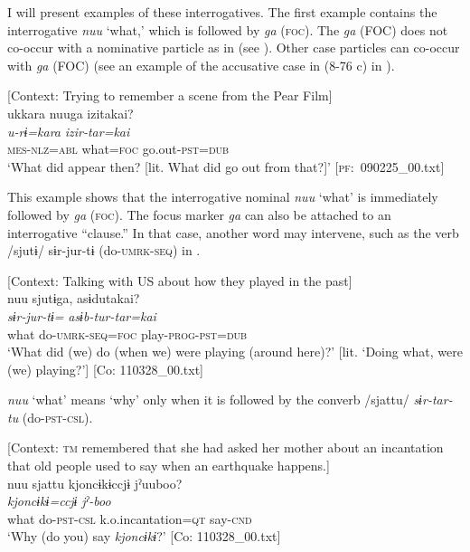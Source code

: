   I will present examples of these interrogatives. The first example contains the interrogative \textit{nuu} ‘what,’ which is followed by \textit{ga} (\textsc{foc}). The \textit{ga} (FOC) does not co-occur with a nominative particle as in  (see ). Other case particles can co-occur with \textit{ga} (FOC) (see an example of the accusative case in (8-76 c) in ).

\ea \label{ex:5:31}   [Context: Trying to remember a scene from the Pear Film]\\
\glll  ukkara  nuuga  izitakai?\\
\textit{u-rɨ=kara}  \textit{}  \textit{izir-tar=kai}\\
\textsc{mes}-\textsc{nlz}=\textsc{abl}  what=\textsc{foc}  go.out-\textsc{pst}=\textsc{dub}\\
\glt ‘What did appear then? [lit. What did go out from that?]’ [\textsc{pf}:~090225\_00.txt]
\z

This example shows that the interrogative nominal \textit{nuu} ‘what’ is immediately followed by \textit{ga} (\textsc{foc}). The focus marker \textit{ga} can also be attached to an interrogative “clause.” In that case, another word may intervene, such as the verb /sjutɨ/ sɨr-jur-tɨ (do-\textsc{umrk}-\textsc{seq}) in .

\ea \label{ex:5:32}   [Context: Talking with US about how they played in the past]\\
\glll  nuu  sjutɨga,  asɨdutakai?\\
\textit{}  \textit{sɨr-jur-tɨ=}  \textit{asɨb-tur-tar=kai}\\
what  do-\textsc{umrk}-\textsc{seq}=\textsc{foc}  play-\textsc{prog}-\textsc{pst}=\textsc{dub}\\
\glt ‘What did (we) do (when we) were playing (around here)?’ [lit. ‘Doing what, were (we) playing?’] [Co: 110328\_00.txt]
\z

\textit{nuu} ‘what’ means ‘why’ only when it is followed by the converb /sjattu/ \textit{sɨr-tar-tu} (do-\textsc{pst}-\textsc{csl}).

\ea \label{ex:5:33}   [Context: \textsc{tm} remembered that she had asked her mother about an incantation that old people used to say when an earthquake happens.]\\
\glll  nuu  sjattu  {\textbar}kjoncɨkɨ{\textbar}ccjɨ  jˀuuboo?\\
\textit{}  \textit{}  \textit{kjoncɨkɨ=ccjɨ}  \textit{jˀ-boo}\\
what  do-\textsc{pst}-\textsc{csl}  k.o.incantation=\textsc{qt}  say-\textsc{cnd}\\
\glt ‘Why (do you) say \textit{kjoncɨkɨ}?’ [Co: 110328\_00.txt]
\z

